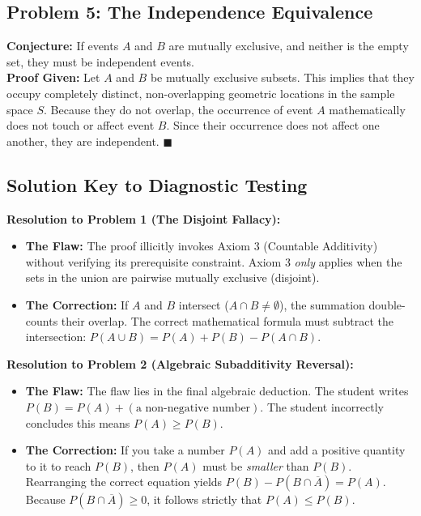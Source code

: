 \documentclass[12pt]{article}
\begin{document}
\subsection*{Problem 5: The Independence Equivalence}
\textbf{Conjecture:} If events $A$ and $B$ are mutually exclusive, and neither is the empty set, they must be independent events. \\
\textbf{Proof Given:} Let $A$ and $B$ be mutually exclusive subsets. This implies that they occupy completely distinct, non-overlapping geometric locations in the sample space $S$. Because they do not overlap, the occurrence of event $A$ mathematically does not touch or affect event $B$. Since their occurrence does not affect one another, they are independent. $\blacksquare$

\newpage
\subsection*{Solution Key to Diagnostic Testing}

\textbf{Resolution to Problem 1 (The Disjoint Fallacy):}
\begin{itemize}
    \item \textbf{The Flaw:} The proof illicitly invokes Axiom 3 (Countable Additivity) without verifying its prerequisite constraint. Axiom 3 \textit{only} applies when the sets in the union are pairwise mutually exclusive (disjoint). 
    \item \textbf{The Correction:} If $A$ and $B$ intersect ($A \cap B \neq \emptyset$), the summation double-counts their overlap. The correct mathematical formula must subtract the intersection: $P(A \cup B) = P(A) + P(B) - P(A \cap B)$.
\end{itemize}

\textbf{Resolution to Problem 2 (Algebraic Subadditivity Reversal):}
\begin{itemize}
    \item \textbf{The Flaw:} The flaw lies in the final algebraic deduction. The student writes $P(B) = P(A) + (\text{a non-negative number})$. The student incorrectly concludes this means $P(A) \geq P(B)$.
    \item \textbf{The Correction:} If you take a number $P(A)$ and add a positive quantity to it to reach $P(B)$, then $P(A)$ must be \textit{smaller} than $P(B)$. Rearranging the correct equation yields $P(B) - P(B \cap \overline{A}) = P(A)$. Because $P(B \cap \overline{A}) \geq 0$, it follows strictly that $P(A) \leq P(B)$.
\end{itemize}
\end{document}
